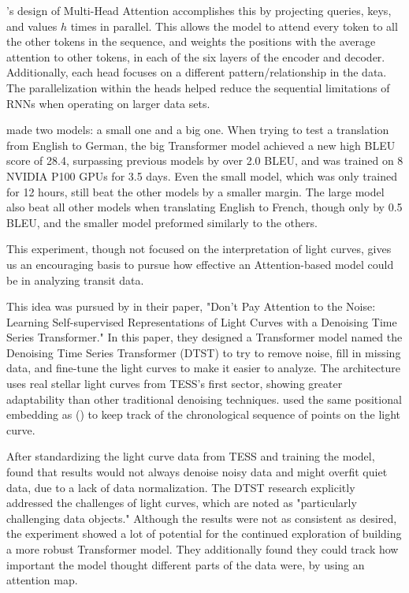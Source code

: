 \documentclass[letterpaper]{article} %
\begin{document}
\citeauthor{vaswani2017attentionneed}'s design of Multi-Head Attention accomplishes this by projecting queries, keys, and values $h$ times in parallel. This allows the model to attend every token to all the other tokens in the sequence, and weights the positions with the average attention to other tokens, in each of the six layers of the encoder and decoder. Additionally, each head focuses on a different pattern/relationship in the data. The parallelization within the heads helped reduce the sequential limitations of RNNs when operating on larger data sets.

\citeauthor{vaswani2017attentionneed} made two models: a small one and a big one. When trying to test a translation from English to German, the big Transformer model achieved a new high BLEU score of 28.4, surpassing previous models by over 2.0 BLEU, and was trained on 8 NVIDIA P100 GPUs for 3.5 days. Even the small model, which was only trained for 12 hours, still beat the other models by a smaller margin. The large model also beat all other models when translating English to French, though only by 0.5 BLEU, and the smaller model preformed similarly to the others.

This experiment, though not focused on the interpretation of light curves, gives us an encouraging basis to pursue how effective an Attention-based model could be in analyzing transit data.

This idea was pursued by \citeauthor{morvan2022dontpayattentionnoise} in their \citeyear{morvan2022dontpayattentionnoise} paper, "Don't Pay Attention to the Noise: Learning Self-supervised Representations of Light Curves with a Denoising Time Series Transformer." In this paper, they designed a Transformer model named the Denoising Time Series Transformer (DTST) to try to remove noise, fill in missing data, and fine-tune the light curves to make it easier to analyze. The architecture uses real stellar light curves from TESS's first sector, showing greater adaptability than other traditional denoising techniques. \citeauthor{morvan2022dontpayattentionnoise} used the same positional embedding as \citeauthor{vaswani2017attentionneed} (\citeyear{vaswani2017attentionneed}) to keep track of the chronological sequence of points on the light curve.

After standardizing the light curve data from TESS and training the model, \citeauthor{morvan2022dontpayattentionnoise} found that results would not always denoise noisy data and might overfit quiet data, due to a lack of data normalization. The DTST research explicitly addressed the challenges of light curves, which are noted as "particularly challenging data objects." Although the results were not as consistent as desired, the experiment showed a lot of potential for the continued exploration of building a more robust Transformer model. They additionally found they could track how important the model thought different parts of the data were, by using an attention map.
\end{document}
